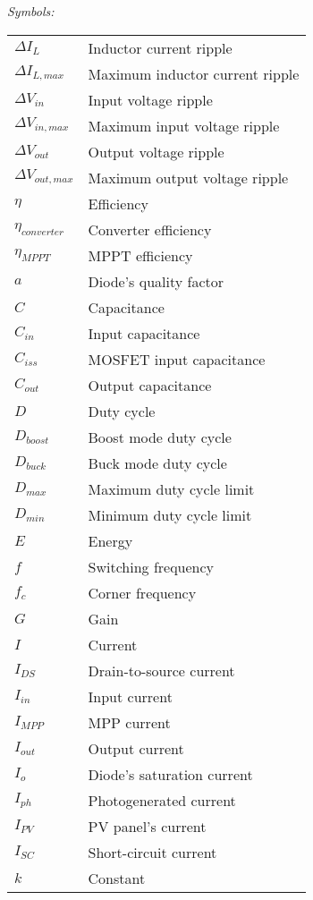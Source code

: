 \vspace{5mm} %
\newpage
\noindent\textit{Symbols:}\newline
\begin{tabular}{ll}
$\Delta I_{L}$ & Inductor current ripple\\
$\Delta I_{L,max}$ & Maximum inductor current ripple\\
$\Delta V_{in}$ & Input voltage ripple\\
$\Delta V_{in,max}$ & Maximum input voltage ripple\\
$\Delta V_{out}$ & Output voltage ripple\\
$\Delta V_{out,max}$ & Maximum output voltage ripple\\
$\eta$ & Efficiency\\
$\eta_{converter}$ & Converter efficiency\\
$\eta_{MPPT}$ & MPPT efficiency\\
$a$ & Diode's quality factor \\
$C$ & Capacitance\\
$C_{in}$ & Input capacitance\\
$C_{iss}$ & MOSFET input capacitance \\ 
$C_{out}$ & Output capacitance\\
$D$ & Duty cycle\\
$D_{boost}$ & Boost mode duty cycle\\
$D_{buck}$ & Buck mode duty cycle\\
$D_{max}$  & Maximum duty cycle limit \\
$D_{min}$  & Minimum duty cycle limit \\ 
$E$ & Energy\\
$f$ & Switching frequency\\
$f_{c}$ & Corner frequency \\
$G$ & Gain \\
$I$ & Current\\
$I_{DS}$ & Drain-to-source current \\
$I_{in}$ & Input current \\
$I_{MPP}$ & MPP current\\
$I_{out}$ & Output current \\
$I_{o}$ & Diode's saturation current \\
$I_{ph}$ & Photogenerated current \\
$I_{PV}$ & PV panel's current \\
$I_{SC}$ & Short-circuit current\\
$k$ & Constant \\

\end{tabular}

